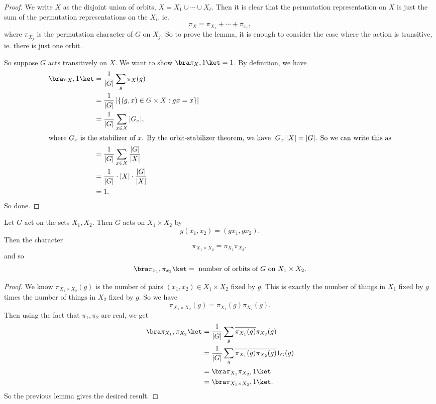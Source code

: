 \documentclass[a4paper]{article}
\begin{document}
\begin{proof}
  We write $X$ as the disjoint union of orbits, $X = X_1 \cup \cdots \cup X_\ell$. Then it is clear that the permutation representation on $X$ is just the sum of the permutation representations on the $X_i$, ie.
  \[
    \pi_X = \pi_{X_1} + \cdots + \pi_{x_\ell},
  \]
  where $\pi_{X_j}$ is the permutation character of $G$ on $X_j$. So to prove the lemma, it is enough to consider the case where the action is transitive, ie. there is just one orbit.

  So suppose $G$ acts transitively on $X$. We want to show $\bra \pi_X, 1\ket = 1$. By definition, we have
  \begin{align*}
    \bra \pi_X, 1 \ket &= \frac{1}{|G|} \sum_g \pi_X(g) \\
    &= \frac{1}{|G|} \left|\{(g, x) \in G\times X: gx = x\}\right|\\
    &= \frac{1}{|G|} \sum_{x \in X} |G_x|,\\
    \intertext{where $G_x$ is the stabilizer of $x$. By the orbit-stabilizer theorem, we have $|G_x||X| = |G|$. So we can write this as}
    &= \frac{1}{|G|} \sum_{x \in X} \frac{|G|}{|X|}\\
    &= \frac{1}{|G|} \cdot |X| \cdot \frac{|G|}{|X|}\\
    &= 1.
  \end{align*}
  So done.
\end{proof}

\begin{lemma}
  Let $G$ act on the sets $X_1, X_2$. Then $G$ acts on $X_1 \times X_2$ by
  \[
    g(x_1, x_2) = (g x_1, g x_2).
  \]
  Then the character
  \[
    \pi_{X_1 \times X_2} = \pi_{X_1}\pi_{X_2},
  \]
  and so
  \[
    \bra \pi_{x_1}, \pi_{x_2}\ket = \text{ number of orbits of }G\text{ on }X_1 \times X_2.
  \]
\end{lemma}

\begin{proof}
  We know $\pi_{X_1 \times X_2}(g)$ is the number of pairs $(x_1, x_2) \in X_1 \times X_2$ fixed by $g$. This is exactly the number of things in $X_1$ fixed by $g$ times the number of things in $X_2$ fixed by $g$. So we have
  \[
    \pi_{X_1 \times X_2}(g) = \pi_{X_1}(g) \pi_{X_2}(g).
  \]
  Then using the fact that $\pi_1, \pi_2$ are real, we get
  \begin{align*}
    \bra \pi_{X_1}, \pi_{X_2}\ket &= \frac{1}{|G|} \sum_g \overline{\pi_{X_1}(g)}\pi_{X_2}(g)\\
    &= \frac{1}{|G|} \sum_g \overline{\pi_{X_1}(g) \pi_{X_2}(g)} 1_G(g)\\
    &= \bra \pi_{X_1}\pi_{X_2}, 1\ket \\
    &= \bra \pi_{X_1\times X_2}, 1\ket.
  \end{align*}
  So the previous lemma gives the desired result.
\end{proof}
\end{document}
